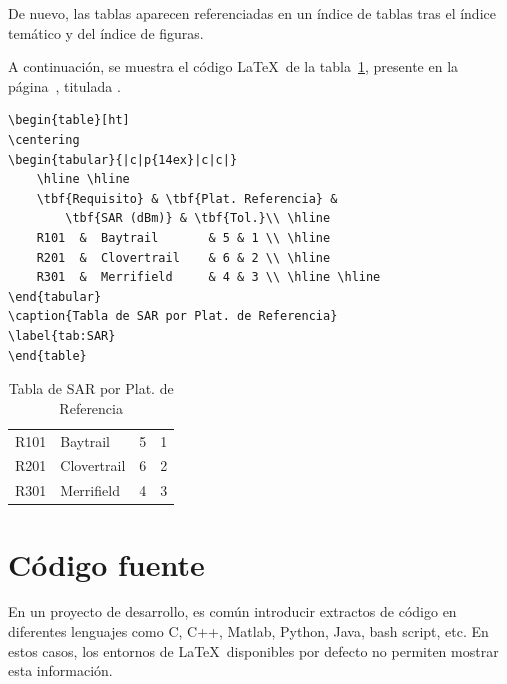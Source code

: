 	De nuevo, las tablas aparecen referenciadas en un índice de tablas tras el índice temático y del índice de figuras.

	A continuación, se muestra el código \LaTeX\ de la tabla~\ref{tab:SAR}, presente en la página~\pageref{tab:SAR}, titulada .

\begin{lstlisting}
\begin{table}[ht]
\centering
\begin{tabular}{|c|p{14ex}|c|c|}
	\hline \hline
	\tbf{Requisito} & \tbf{Plat. Referencia} &
		\tbf{SAR (dBm)} & \tbf{Tol.}\\ \hline
	R101  &  Baytrail 		& 5 & 1 \\ \hline
	R201  &  Clovertrail 	& 6 & 2 \\ \hline
	R301  &  Merrifield 	& 4 & 3 \\ \hline \hline
\end{tabular}
\caption{Tabla de SAR por Plat. de Referencia}
\label{tab:SAR}
\end{table}
\end{lstlisting}

	\begin{table}[ht]%
	\centering
	\begin{tabular}{|c|p{14ex}|c|c|}
		\hline \hline
		\tbf{Requisito} & \tbf{Plat. Referencia} &
			\tbf{SAR (dBm)} & \tbf{Tol.}\\ \hline
		R101  &  Baytrail 		& 5 & 1 \\ \hline
		R201  &  Clovertrail 	& 6 & 2 \\ \hline
		R301  &  Merrifield 	& 4 & 3 \\ \hline \hline
	\end{tabular}
	\caption{Tabla de SAR por Plat. de Referencia}
	\label{tab:SAR}
	\end{table}

\section{Código fuente}

En un proyecto de desarrollo, es común introducir extractos de código en diferentes lenguajes como C, C++, Matlab, Python, Java, bash script, etc. En estos casos, los entornos de \LaTeX\ disponibles por defecto no permiten mostrar esta información.

